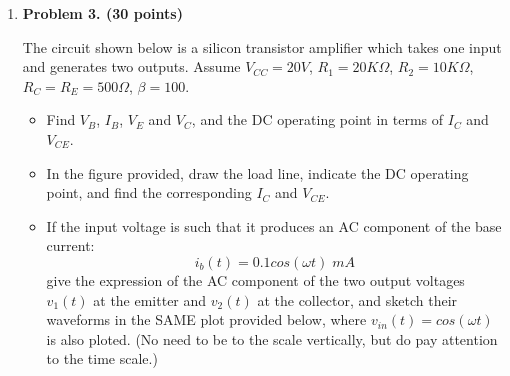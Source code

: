 \begin{enumerate}
\begin{comment}
\begin{itemize}
\item $\beta \uparrow \Longrightarrow V_C \downarrow \Longrightarrow 
	I_B \downarrow \Longrightarrow I_C \uparrow $
\item
\[ I_B=\frac{V_{CC}-0.7}{(\beta+1)R_C+R_B},\;\;\;\;\;
   I_C=\beta I_B=\frac{\beta(V_{CC}-0.7)}{(\beta+1)R_C+R_B}  \]
\item If $(\beta+1)R_C \gg R_B$, then $I_C \approx (V_{CC}-0.7)/R_C$, 
independent of $\beta$.
\item $I_C=2mA$, $V_C=5V$, $R_C=(V_{CC}-V_C)/I_C=5V/2mA=2.5K\Omega$,
$I_B=I_C/\beta=0.02mA$, $R_B=(5-0.7)/0.02=4.3/0.02=215K\Omega$.
\item 
When $\beta=50$:
\[	I_B=\frac{V_{CC}-0.7}{(\beta+1)R_C+R_B}=\frac{9.3}{51\times 2.5K+215}
	=0.027mA \]
\[ 	I_C=\beta I_B=1.36mA,\;\;\;V_C=V_{CC}-(\beta+1)I_B=6.6V \]
When $\beta=100$:
\[	I_B=\frac{V_{CC}-0.7}{(\beta+1)R_C+R_B}=\frac{9.3}{101\times 2.5K+215}
	=0.02mA \]
\[ 	I_C=\beta I_B=2 mA,\;\;\;V_C=V_{CC}-(\beta+1)I_B=5V \]
When $\beta=200$:
\[	I_B=\frac{V_{CC}-0.7}{(\beta+1)R_C+R_B}=\frac{9.3}{201\times 2.5K+215}
	=0.013mA \]
\[ 	I_C=\beta I_B=2.6mA,\;\;\;V_C=V_{CC}-(\beta+1)I_B=3.5V \]
\end{itemize}
\end{comment}

\item {\bf Problem 3. (30 points)} 


The circuit shown below is a silicon transistor amplifier which takes one
input and generates two outputs. Assume $V_{CC}=20V$, $R_1=20K\Omega$,
$R_2=10K\Omega$, $R_C=R_E=500\Omega$, $\beta=100$. 

\begin{itemize}
\item Find $V_B$, $I_B$, $V_E$ and $V_C$, and the DC operating point in 
terms of $I_C$ and $V_{CE}$. 
\item In the figure provided, draw the load line, indicate the DC operating 
point, and find the corresponding $I_C$ and $V_{CE}$.
\item If the input voltage is such that it produces an AC component of the 
base current:
\[	i_b(t)=0.1 cos(\omega t) \; mA	\]
give the expression of the AC component of the two output voltages $v_1(t)$ 
at the emitter and $v_2(t)$ at the collector, and sketch their waveforms in 
the SAME plot provided below, where $v_{in}(t)=cos(\omega t)$ is also ploted.
(No need to be to the scale vertically, but do pay attention to the time
scale.)
\end{itemize}


\end{enumerate}
